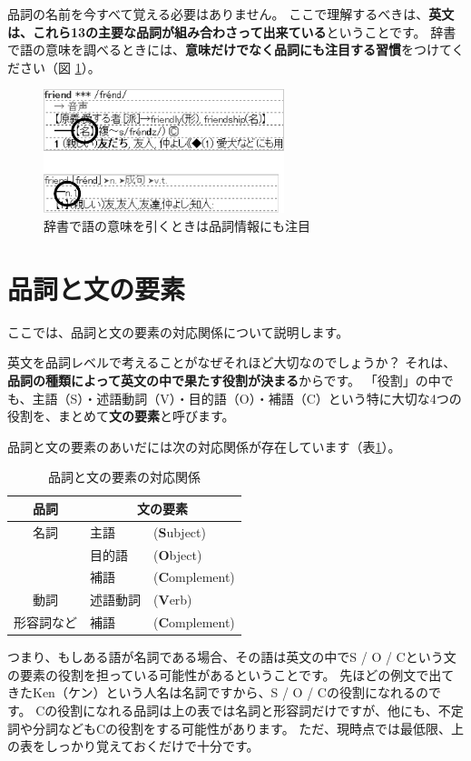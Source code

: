 \documentclass[titlepage]{jsarticle}
\begin{document}
 品詞の名前を今すべて覚える必要はありません。
 ここで理解するべきは、{\bf 英文は、これら13の主要な品詞が組み合わさって出来ている}ということです。
 辞書で語の意味を調べるときには、{\bf 意味だけでなく品詞にも注目する習慣}をつけてください（図 \ref{fig3}）。
  \begin{figure}[htbp]
   \begin{center}
    \includegraphics[width=7cm]{./figure/fig3.pdf}
    \caption{辞書で語の意味を引くときは品詞情報にも注目}
    \label{fig3}
   \end{center}
  \end{figure}


 \section{品詞と文の要素}
 ここでは、品詞と文の要素の対応関係について説明します。

 英文を品詞レベルで考えることがなぜそれほど大切なのでしょうか？
 それは、{\bf 品詞の種類によって英文の中で果たす役割が決まる}からです。
 「役割」の中でも、主語（S）・述語動詞（V）・目的語（O）・補語（C）という特に大切な4つの役割を、まとめて{\bf 文の要素}と呼びます。

 品詞と文の要素のあいだには次の対応関係が存在しています（表\ref{tab1}）。
 \begin{table}[htbp]
  \begin{center}
   \caption{品詞と文の要素の対応関係}
   \begin{tabular}{|c|ll|}
    \hline
    品詞 & \multicolumn{2}{|c|}{文の要素} \\ \hline \hline
    名詞 & 主語 & ({\bf S}ubject) \\ 
    & 目的語 & ({\bf O}bject) \\
    & 補語 & ({\bf C}omplement) \\ \hline
    動詞 & 述語動詞 & ({\bf V}erb) \\ \hline
    形容詞など & 補語 & ({\bf C}omplement) \\ \hline
   \end{tabular}
   \label{tab1}
  \end{center}
 \end{table}
 つまり、もしある語が名詞である場合、その語は英文の中でS / O / Cという文の要素の役割を担っている可能性があるということです。
 先ほどの例文で出てきたKen（ケン）という人名は名詞ですから、S / O / Cの役割になれるのです。
 Cの役割になれる品詞は上の表では名詞と形容詞だけですが、他にも、不定詞や分詞などもCの役割をする可能性があります。
 ただ、現時点では最低限、上の表をしっかり覚えておくだけで十分です。
\end{document}

